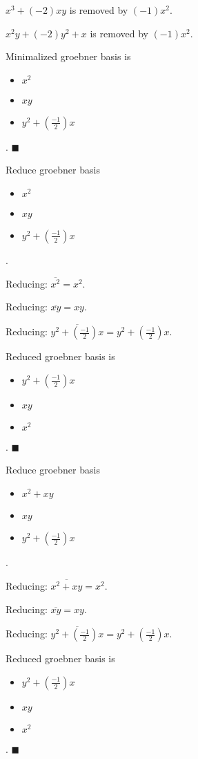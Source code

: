 \documentclass{jsarticle}
\begin{document}
$x^{3}+(-2)xy$ is removed by $(-1)x^{2}$.  

$x^{2}y+(-2)y^{2}+x$ is removed by $(-1)x^{2}$.  

Minimalized groebner basis is 
\begin{itemize}
\item $x^{2}$
\item $xy$
\item $y^{2}+(\frac{-1}{2})x$
\end{itemize}  . 
$\blacksquare{}$

Reduce groebner basis 
\begin{itemize}
\item $x^{2}$
\item $xy$
\item $y^{2}+(\frac{-1}{2})x$
\end{itemize}  . 


Reducing: $\overline{x^{2}} = x^{2}$.  

Reducing: $\overline{xy} = xy$.  

Reducing: $\overline{y^{2}+(\frac{-1}{2})x} = y^{2}+(\frac{-1}{2})x$.  

Reduced groebner basis is 
\begin{itemize}
\item $y^{2}+(\frac{-1}{2})x$
\item $xy$
\item $x^{2}$
\end{itemize}  . 
$\blacksquare{}$

Reduce groebner basis 
\begin{itemize}
\item $x^{2}+xy$
\item $xy$
\item $y^{2}+(\frac{-1}{2})x$
\end{itemize}  . 


Reducing: $\overline{x^{2}+xy} = x^{2}$.  

Reducing: $\overline{xy} = xy$.  

Reducing: $\overline{y^{2}+(\frac{-1}{2})x} = y^{2}+(\frac{-1}{2})x$.  

Reduced groebner basis is 
\begin{itemize}
\item $y^{2}+(\frac{-1}{2})x$
\item $xy$
\item $x^{2}$
\end{itemize}  . 
$\blacksquare{}$
\end{document}
